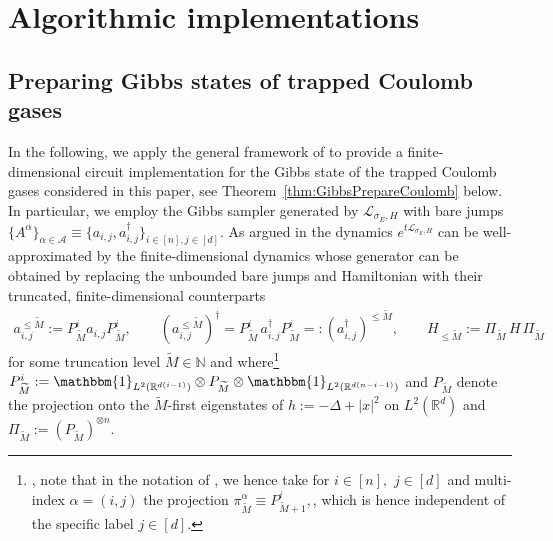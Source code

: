 \documentclass[11pt]{amsart}
\newcommand{\1}{\mathbbm{1}}
\newcommand{\R}{\mathbb{R}}
\newcommand{\N}{\mathbb{N}}
\newcommand{\cL}{\mathcal{L}}
\newcommand{\cA}{\mathcal{A}}
\theoremstyle{plain}
\theoremstyle{definition}
\theoremstyle{remark}
\numberwithin{equation}{section}
\begin{document}
\section{Algorithmic implementations}
\subsection{Preparing Gibbs states of trapped Coulomb gases}
\label{sec:GibbscircuitCoulomb}
In the following, we apply the general framework of \cite[Section 4.3 \& 4.5]{BeckerRouzeSalzmannToAppearcmp} to provide a finite-dimensional circuit implementation for the Gibbs state of the trapped Coulomb gases considered in this paper, see Theorem~\ref{thm:GibbsPrepareCoulomb} below. In particular, we employ the Gibbs sampler generated by $\cL_{\sigma_E,H}$ with bare jumps $\{A^\alpha\}_{\alpha\in\cA} \equiv \{a_{i,j},a_{i,j}^\dagger\}_{i\in[n],j\in[d]}.$  As argued in \cite[Theorem 4.12]{BeckerRouzeSalzmannToAppearcmp} the dynamics $e^{t\cL_{\sigma_E,H}}$ can be well-approximated by the finite-dimensional dynamics whose generator can be obtained by replacing the unbounded bare jumps and Hamiltonian with their truncated, finite-dimensional counterparts
\begin{align}
\label{eq:DefTruncOperators}
    a^{\le \widetilde M}_{i,j} := P^i_{\widetilde M} a_{i,j} P^i_{\widetilde M},\quad\quad \left(a_{i,j}^{\le\widetilde M}\right)^\dagger = P^i_{\widetilde M}\,a_{i,j}^\dagger P^i_{\widetilde M} =: \left(a_{i,j}^\dagger\right)^{\le \widetilde M}, \quad\quad H_{\le \widetilde M} := \Pi_{\widetilde M} \,H\,\Pi_{\widetilde M}
\end{align}
for some truncation level $\widetilde M\in \N$ and where\footnote{, note that in the notation of \cite{BeckerRouzeSalzmannToAppearcmp}, we 
hence take for $i\in[n],$ $j\in[d]$ and multi-index $\alpha = (i,j)$ the projection $\pi^{\alpha}_{\widetilde M} \equiv P^{i}_{\widetilde M+1},$, which is hence independent of the specific label $j\in[d].$
}  $P^i_{\widetilde M} :=\1_{L^2(\R^{d(i-1)})}\otimes P_{\widetilde M}\otimes  \1_{L^2(\R^{d(n-i-1)})}$ and $P_{\widetilde M}$ denote the projection onto the $\widetilde M$-first eigenstates of $h:=-\Delta + |x|^2$ on $L^{2}(\R^{d})$ and $\Pi_{\widetilde M} := \left(P_{\widetilde M}\right)^{\otimes n}.$
\end{document}
